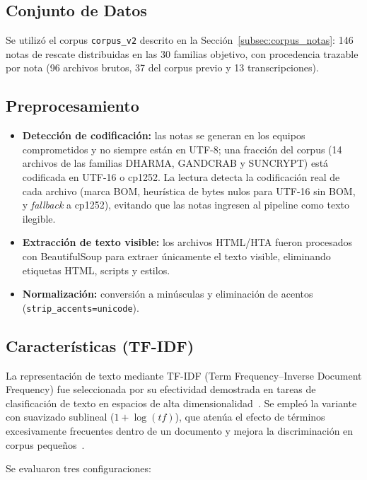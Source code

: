 \subsection{Conjunto de Datos}
Se utilizó el corpus \texttt{corpus\_v2} descrito en la Sección~\ref{subsec:corpus_notas}: 146 notas de rescate distribuidas en las 30 familias objetivo, con procedencia trazable por nota (96 archivos brutos, 37 del corpus previo y 13 transcripciones).

\subsection{Preprocesamiento}
\begin{itemize}
\item \textbf{Detección de codificación:} las notas se generan en los equipos comprometidos y no siempre están en UTF-8; una fracción del corpus (14 archivos de las familias DHARMA, GANDCRAB y SUNCRYPT) está codificada en UTF-16 o cp1252. La lectura detecta la codificación real de cada archivo (marca BOM, heurística de bytes nulos para UTF-16 sin BOM, y \textit{fallback} a cp1252), evitando que las notas ingresen al pipeline como texto ilegible.
\item \textbf{Extracción de texto visible:} los archivos HTML/HTA fueron procesados con BeautifulSoup para extraer únicamente el texto visible, eliminando etiquetas HTML, scripts y estilos.
\item \textbf{Normalización:} conversión a minúsculas y eliminación de acentos (\texttt{strip\_accents=unicode}).
\end{itemize}
\subsection{Características (TF-IDF)}

La representación de texto mediante TF-IDF (Term Frequency--Inverse Document Frequency) fue seleccionada por su efectividad demostrada en tareas de clasificación de texto en espacios de alta dimensionalidad~\cite{joachims1998}. Se empleó la variante con suavizado sublineal ($1 + \log(tf)$), que atenúa el efecto de términos excesivamente frecuentes dentro de un documento y mejora la discriminación en corpus pequeños~\cite{sklearn}.

Se evaluaron tres configuraciones:


